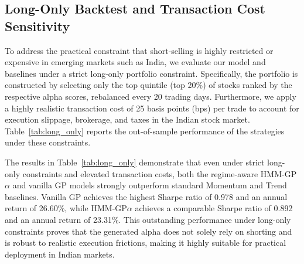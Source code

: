 \documentclass{ieeeaccess}
\newcommand{\revised}[1]{#1}
\begin{document}
\subsection{\revised{Long-Only Backtest and Transaction Cost Sensitivity}}
\label{sec:long_only}
\revised{To address the practical constraint that short-selling is highly restricted or expensive in emerging markets such as India, we evaluate our model and baselines under a strict long-only portfolio constraint. Specifically, the portfolio is constructed by selecting only the top quintile (top 20\%) of stocks ranked by the respective alpha scores, rebalanced every 20 trading days. Furthermore, we apply a highly realistic transaction cost of 25 basis points (bps) per trade to account for execution slippage, brokerage, and taxes in the Indian stock market. Table~\ref{tab:long_only} reports the out-of-sample performance of the strategies under these constraints.}

\begin{table}[!htbp]
\centering
\caption{\revised{Out-of-Sample Performance under Long-Only Constraints (25 bps Transaction Cost).}}
\label{tab:long_only}
{\color{red} %
}
\end{table}

\revised{The results in Table~\ref{tab:long_only} demonstrate that even under strict long-only constraints and elevated transaction costs, both the regime-aware HMM-GP$\alpha$ and vanilla GP models strongly outperform standard Momentum and Trend baselines. Vanilla GP achieves the highest Sharpe ratio of 0.978 and an annual return of 26.60\%, while HMM-GP$\alpha$ achieves a comparable Sharpe ratio of 0.892 and an annual return of 23.31\%. This outstanding performance under long-only constraints proves that the generated alpha does not solely rely on shorting and is robust to realistic execution frictions, making it highly suitable for practical deployment in Indian markets.}
\end{document}
